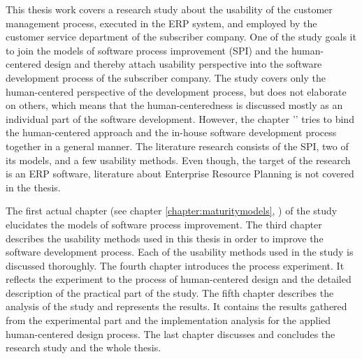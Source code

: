 \documentclass[12pt,a4paper,oneside,pdftex]{report}
\begin{document}
This thesis work covers a research study about the usability of the customer management process, executed in the ERP system, and employed by the customer service department of the subscriber company. One of the study goals it to join the models of software process improvement (SPI) and the human-centered design and thereby attach usability perspective into the software development process of the subscriber company. The study covers only the human-centered perspective of the development process, but does not elaborate on others, which means that the human-centeredness is discussed mostly as an individual part of the software development. However, the chapter '' tries to bind the human-centered approach and the in-house software development process together in a general manner. The literature research consists of the SPI, two of its models, and a few usability methods. Even though, the target of the research is an ERP software, literature about Enterprise Resource Planning is not covered in the thesis.

The first actual chapter (see chapter \ref{chapter:maturitymodels}, ) of the study elucidates the models of software process improvement. The third chapter describes the usability methods used in this thesis in order to improve the software development process. Each of the usability methods used in the study is discussed thoroughly. The fourth chapter introduces the process experiment. It reflects the experiment to the process of human-centered design and the detailed description of the practical part of the study. The fifth chapter describes the analysis of the study and represents the results. It contains the results gathered from the experimental part and the implementation analysis for the applied human-centered design process. The last chapter discusses and concludes the research study and the whole thesis.

    
    





\end{document}
